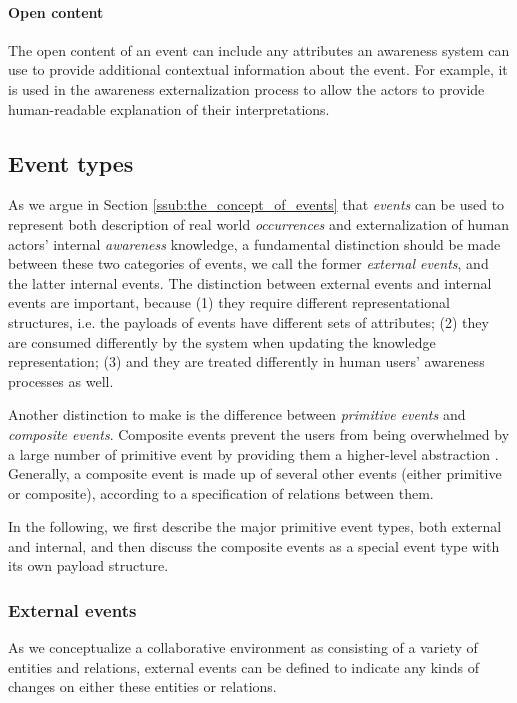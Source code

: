 \paragraph*{Open content} %
\label{par:open_content}
The open content of an event can include any attributes an awareness system can use to provide additional contextual information about the event. For example, it is used in the awareness externalization process to allow the actors to provide human-readable explanation of their interpretations.

\subsection{Event types} %
\label{sub:event_types}
As we argue in Section \ref{ssub:the_concept_of_events} that \emph{events} can be used to represent both description of real world \emph{occurrences} and externalization of human actors' internal \emph{awareness} knowledge, a fundamental distinction should be made between these two categories of events, we call the former \emph{external events}, and the latter {internal events}. The distinction between external events and internal events are important, because (1) they require different representational structures, i.e. the payloads of events have different sets of attributes; (2) they are consumed differently by the system when updating the knowledge representation; (3) and they are treated differently in  human users' awareness processes as well. 

Another distinction to make is the difference between \emph{primitive events} and \emph{composite events}. Composite events prevent the users from being overwhelmed by a large number of primitive event by providing them a higher-level abstraction \cite{Mhl2010}. Generally, a composite event is made up of several other events (either primitive or composite), according to a specification of relations between them. 

In the following, we first describe the major primitive event types, both external and internal, and then discuss the composite events as a special event type with its own payload structure.

\subsubsection{External events} %
\label{ssub:external_events}
As we conceptualize a collaborative environment as consisting of a variety of entities and relations, external events can be defined to indicate any kinds of changes on either these entities or relations. 

